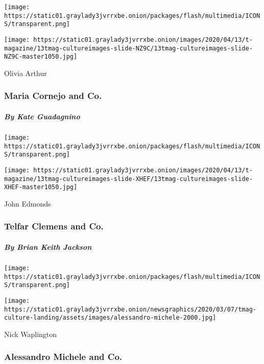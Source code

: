 \texttt{[image: https://static01.graylady3jvrrxbe.onion/packages/flash/multimedia/ICONS/transparent.png]}

\texttt{[image: https://static01.graylady3jvrrxbe.onion/images/2020/04/13/t-magazine/13tmag-cultureimages-slide-NZ9C/13tmag-cultureimages-slide-NZ9C-master1050.jpg]}

Olivia Arthur

\hypertarget{maria-cornejo-and-co}{%
\subsubsection{Maria Cornejo and Co.}\label{maria-cornejo-and-co}}

\hypertarget{by-kate-guadagnino}{%
\subparagraph{By Kate Guadagnino}\label{by-kate-guadagnino}}

\href{https://www.nytimes3xbfgragh.onion/interactive/2020/04/13/t-magazine/maria-cornejo-olivier-rousteing-telfar-clemens-alessandro-michele.html\#telfar-clemens-and-co}{}

\texttt{[image: https://static01.graylady3jvrrxbe.onion/packages/flash/multimedia/ICONS/transparent.png]}

\texttt{[image: https://static01.graylady3jvrrxbe.onion/images/2020/04/13/t-magazine/13tmag-cultureimages-slide-XHEF/13tmag-cultureimages-slide-XHEF-master1050.jpg]}

John Edmonds

\hypertarget{telfar-clemens-and-co}{%
\subsubsection{Telfar Clemens and Co.}\label{telfar-clemens-and-co}}

\hypertarget{by-brian-keith-jackson-1}{%
\subparagraph{By Brian Keith Jackson}\label{by-brian-keith-jackson-1}}

\href{https://www.nytimes3xbfgragh.onion/interactive/2020/04/13/t-magazine/maria-cornejo-olivier-rousteing-telfar-clemens-alessandro-michele.html\#alessandro-michele-and-co}{}

\texttt{[image: https://static01.graylady3jvrrxbe.onion/packages/flash/multimedia/ICONS/transparent.png]}

\texttt{[image: https://static01.graylady3jvrrxbe.onion/newsgraphics/2020/03/07/tmag-culture-landing/assets/images/alessandro-michele-2000.jpg]}

Nick Waplington

\hypertarget{alessandro-michele-and-co}{%
\subsubsection{Alessandro Michele and
Co.}\label{alessandro-michele-and-co}}

